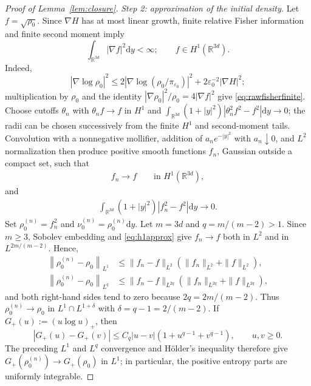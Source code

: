 \documentclass[11pt]{article}
\theoremstyle{definition}
\newcommand{\R}{\mathbb R}
\newcommand{\dd}{\mathrm d}
\newcommand{\eps}{\varepsilon}
\begin{document}
\begin{proof}[Proof of Lemma~\ref{lem:closure}]
\smallskip
\noindent\emph{Step 2: approximation of the initial density.}
Let $f=\sqrt{\rho_0}$. Since $\nabla H$ has at most linear growth, finite
relative Fisher information and finite second moment imply
\begin{equation}\label{eq:rawfisherfinite}
 \int_{\R^{3d}}|\nabla f|^2\dd y<\infty;
 \qquad f\in H^1(\R^{3d}).
\end{equation}
Indeed,
\[
\left|\nabla\log\rho_0\right|^2\leq
2\left|\nabla\log(\rho_0/\pi_{\eps_0})\right|^2+2\eps_0^{-2}\left|\nabla H\right|^2;
\]
multiplication by $\rho_0$ and the identity
$|\nabla\rho_0|^2/\rho_0=4|\nabla f|^2$ give \eqref{eq:rawfisherfinite}.
Choose cutoffs $\theta_n$ with $\theta_nf\to f$ in $H^1$ and
$\int_{\R^{3d}}\left(1+|y|^2\right)\left|\theta_n^2f^2-f^2\right|\dd y\to0$; 
the radii can be chosen
successively from the finite $H^1$ and second-moment tails. Convolution with a
nonnegative mollifier, addition of $a_ne^{-|y|^2}$ with $a_n\downarrow0$, and
$L^2$ normalization then produce positive smooth functions $f_n$, Gaussian
outside a compact set, such that
\begin{align}
 f_n\longrightarrow f \qquad\text{in }H^1(\R^{3d}),\label{eq:h1approx}
\end{align}
and
\begin{align}
 \int_{\R^{3d}}\left(1+|y|^2\right)\left|f_n^2-f^2\right|\dd y\longrightarrow0.
 \label{eq:weightedapprox}
\end{align}
Set $\rho_0^{(n)}=f_n^2$ and $\nu_0^{(n)}=\rho_0^{(n)}\dd y$.
Let $m=3d$ and $q=m/(m-2)>1$. Since $m\geq3$, Sobolev embedding and
\eqref{eq:h1approx} give $f_n\to f$ both in $L^2$ and in
$L^{2m/(m-2)}$. Hence,
\begin{align*}
 \left\|\rho_0^{(n)}-\rho_0\right\|_{L^1}
 &\leq \|f_n-f\|_{L^2}(\|f_n\|_{L^2}+\|f\|_{L^2}),\\
 \left\|\rho_0^{(n)}-\rho_0\right\|_{L^q}
 &\leq \|f_n-f\|_{L^{2q}}
          (\|f_n\|_{L^{2q}}+\|f\|_{L^{2q}}),
\end{align*}
and both right-hand sides tend to zero because $2q=2m/(m-2)$.
Thus $\rho_0^{(n)}\to\rho_0$ in $L^1\cap L^{1+\delta}$ with
$\delta=q-1=2/(m-2)$. If $G_+(u):=(u\log u)_+$, then
\[
 |G_+(u)-G_+(v)|
 \leq C_q|u-v|\left(1+u^{q-1}+v^{q-1}\right),\qquad u,v\geq0.
\]
The preceding $L^1$ and $L^q$ convergence and H\"older's inequality therefore
give $G_+\left(\rho_0^{(n)}\right)\to G_+(\rho_0)$ in $L^1$; in particular, the positive
entropy parts are uniformly integrable.


\end{proof}
\end{document}
